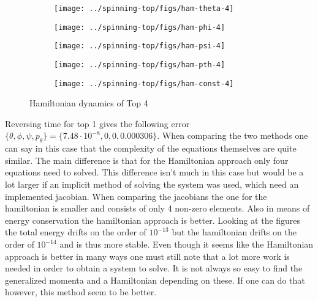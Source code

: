 \begin{figure}[H]
  \centering
  \begin{subfigure}{0.49\textwidth}
    \texttt{[image: ../spinning-top/figs/ham-theta-4]}
    \caption{}
  \end{subfigure}
  \begin{subfigure}{0.49\textwidth}
    \texttt{[image: ../spinning-top/figs/ham-phi-4]}
    \caption{}
  \end{subfigure}
  \begin{subfigure}{0.49\textwidth}
    \texttt{[image: ../spinning-top/figs/ham-psi-4]}
    \caption{}
    \end{subfigure}
  \begin{subfigure}{0.49\textwidth}
    \texttt{[image: ../spinning-top/figs/ham-pth-4]}
    \caption{}
    \end{subfigure}
  \begin{subfigure}{0.49\textwidth}
    \texttt{[image: ../spinning-top/figs/ham-const-4]}
    \caption{}
    \label{fig:hamE4}
  \end{subfigure}
  \caption{Hamiltonian dynamics of Top 4}
  \label{fig:ham-motion-Top4}
\end{figure}

Reversing time for top 1 gives the following error $\{\theta,\phi,\psi,p_\theta\} = \{7.48 \cdot 10^{-8},0,0,0.000306\}$. When comparing the two methods one can say in this case that the complexity of the equations themselves are quite similar. The main difference is that for the Hamiltonian approach only four equations need to solved. This difference isn't much in this case but would be a lot larger if an implicit method of solving the system was used, which need an implemented jacobian. When comparing the jacobians the one for the hamiltonian is smaller and consists of only 4 non-zero elements. Also in means of energy conservation the hamiltonian approach is better. Looking at the figures the total energy drifts on the order of $10^{-13}$ but the hamiltonian drifts on the order of $10^{-14}$ and is thus more stable. Even though it seems like the Hamiltonian approach is better in many ways one must still note that a lot more work is needed in order to obtain a system to solve. It is not always so easy to find the generalized momenta and a Hamiltonian depending on these. If one can do that however, this method seem to be better.
